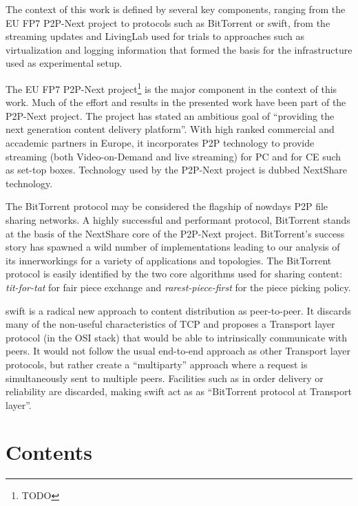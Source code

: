 The context of this work is defined by several key components, ranging from
the EU FP7 P2P-Next project to protocols such as BitTorrent or swift, from
the streaming updates and LivingLab used for trials to approaches such as
virtualization and logging information that formed the basis for the
infrastructure used as experimental setup.

The EU FP7 P2P-Next project\footnote{TODO} is the major component in the
context of this work. Much of the effort and results in the presented work
have been part of the P2P-Next project. The project has stated an ambitious
goal of ``providing the next generation content delivery platform''. With high
ranked commercial and accademic partners in Europe, it incorporates P2P
technology to provide streaming (both Video-on-Demand and live streaming) for
PC and for CE such as set-top boxes. Technology used by the P2P-Next project
is dubbed NextShare technology.

The BitTorrent protocol may be considered the flagship of nowdays P2P file
sharing networks. A highly successful and performant protocol, BitTorrent
stands at the basis of the NextShare core of the P2P-Next project.
BitTorrent's success story has spawned a wild number of implementations
leading to our analysis of its innerworkings for a variety of applications and
topologies. The BitTorrent protocol is easily identified by the two core
algorithms used for sharing content: \textit{tit-for-tat} for fair piece
exchange and \textit{rarest-piece-first} for the piece picking policy.

swift is a radical new approach to content distribution as peer-to-peer. It
discards many of the non-useful characteristics of TCP and proposes a
Transport layer protocol (in the OSI stack) that would be able to
intrinsically communicate with peers. It would not follow the usual end-to-end
approach as other Transport layer protocols, but rather create a
``multiparty'' approach where a request is simultaneously sent to multiple
peers. Facilities such as in order delivery or reliability are discarded,
making swift act as as ``BitTorrent protocol at Transport layer''.


\section{Contents}
\label{sec:intro:contents}

